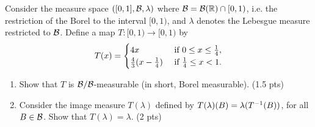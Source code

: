 \begin{ex}
	Consider the measure space $([0, 1], \mathcal{B}, \lambda)$ where $\mathcal{B} = \mathcal{B}(\mathbb{R}) \cap [0, 1)$, i.e. the restriction of the Borel \siga to the interval $[0, 1)$, and $\lambda$ denotes the Lebesgue measure restricted to $\mathcal{B}$. Define a map $T:[0, 1) \to [0, 1)$ by
	\begin{align*}
	T(x) = \begin{cases}
	4x &\text{ if } 0 \leq x \leq \frac{1}{4},\\
	\frac{4}{3}( x - \frac{1}{4}) &\text{ if } \frac{1}{4} \leq x < 1.
	\end{cases}
	\end{align*}
	
	\begin{enumerate}
		\item Show that $T$ is $\mathcal{B}/\mathcal{B}$-measurable (in short, Borel measurable). (1.5 pts)
		\item Consider the image measure $T(\lambda)$ defined by $T(\lambda)(B) = \lambda({T}^{-1}(B))$, for all $B \in \mathcal{B}$. Show that $T(\lambda) = \lambda$. (2 pts)
	\end{enumerate}
\end{ex}


